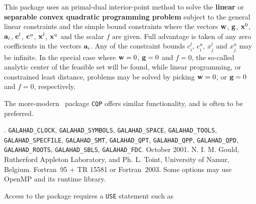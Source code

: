 \documentclass{galahad}
\newcommand{\packagename}{LSQP}
\newcommand{\fullpackagename}{\libraryname\_\-\packagename}
\begin{document}
\galheader


\galsummary
This package uses an primal-dual interior-point method
to solve the {\bf linear} or {\bf separable convex quadratic 
programming problem}
subject to the general linear constraints
and the simple bound constraints
where the vectors ${\mathbf{w}}$, ${\mathbf{g}}$, ${\mathbf{x}}^{0}$, 
${\mathbf{a}}_{i}$, ${\mathbf{c}}^{l}$, ${\mathbf{c}}^{u}$, ${\mathbf{x}}^{l}$, ${\mathbf{x}}^{u}$ and 
the scalar $f$ are given.
Full advantage is taken of any zero coefficients in the 
vectors ${\mathbf{a}}_{i}$. 
Any of the constraint bounds $c_{i}^{l}$, $c_{i}^{u}$, 
$x_{j}^{l}$ and $x_{j}^{u}$ may be infinite.
In the special case where ${\mathbf{w}} = 0$, ${\mathbf{g}} = 0$ and $f = 0$,
the so-called analytic center of the feasible set will be found,
while linear programming, or constrained least distance, problems
may be solved by picking ${\mathbf{w}} = 0$, or ${\mathbf{g}} = 0$ and $f = 0$, respectively.

The more-modern \galahad\ package {\tt CQP} offers similar functionality, and
is often to be preferred.


\galattributes
\galversions{\tt  \fullpackagename\_single, \fullpackagename\_double}.
\galuses 
{\tt GALAHAD\_\-CLOCK},
{\tt GALAHAD\_SY\-M\-BOLS}, 
{\tt GALAHAD\-\_SPACE}, 
{\tt GALAHAD\_TOOLS}, 
{\tt GALAHAD\_SPECFILE}, 
{\tt GALAHAD\_SMT}, 
{\tt GALAHAD\_QPT}, 
{\tt GALAHAD\_QPP}, 
{\tt GALAHAD\_\-QPD}, 
{\tt GALAHAD\-\_ROOTS}, 
{\tt GALAHAD\_SBLS},
{\tt GALAHAD\_FDC}.
\galdate October 2001.
\galorigin N. I. M. Gould, Rutherford Appleton Laboratory, and
Ph. L. Toint, University of Namur, Belgium.
\gallanguage Fortran~95 + TR 15581 or Fortran~2003. 
\galparallelism Some options may use OpenMP and its runtime library.


\galhowto


Access to the package requires a {\tt USE} statement such as
\end{document}
